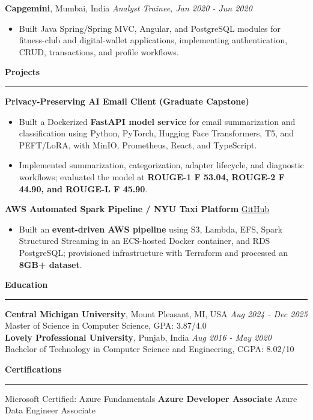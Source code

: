 \documentclass[11pt,letterpaper]{article}
\newcommand{\ressection}[1]{\Needspace{5\baselineskip}\vspace{8pt}\par\textbf{#1}\par\vspace{2pt}\hrule\vspace{5pt}}
\begin{document}
\textbf{Capgemini}, Mumbai, India \hfill \textit{Analyst Trainee, Jan 2020 - Jun 2020}
\begin{itemize}
  \item Built Java Spring/Spring MVC, Angular, and PostgreSQL modules for fitness-club and digital-wallet applications, implementing authentication, CRUD, transactions, and profile workflows.
\end{itemize}

\ressection{Projects}
\textbf{Privacy-Preserving AI Email Client (Graduate Capstone)}
\begin{itemize}
  \item Built a Dockerized \textbf{FastAPI model service} for email summarization and classification using Python, PyTorch, Hugging Face Transformers, T5, and PEFT/LoRA, with MinIO, Prometheus, React, and TypeScript.
  \item Implemented summarization, categorization, adapter lifecycle, and diagnostic workflows; evaluated the model at \textbf{ROUGE-1 F 53.04, ROUGE-2 F 44.90, and ROUGE-L F 45.90}.
\end{itemize}
\vspace{3pt}\par
\textbf{AWS Automated Spark Pipeline / NYU Taxi Platform} \hfill \href{https://github.com/preferablehuman/AWS-automated-spark-pipeline}{GitHub}
\begin{itemize}
  \item Built an \textbf{event-driven AWS pipeline} using S3, Lambda, EFS, Spark Structured Streaming in an ECS-hosted Docker container, and RDS PostgreSQL; provisioned infrastructure with Terraform and processed an \textbf{8GB+ dataset}.
\end{itemize}

\ressection{Education}
\textbf{Central Michigan University}, Mount Pleasant, MI, USA \hfill \textit{Aug 2024 - Dec 2025}\\
Master of Science in Computer Science, GPA: 3.87/4.0\\[3pt]
\textbf{Lovely Professional University}, Punjab, India \hfill \textit{Aug 2016 - May 2020}\\
Bachelor of Technology in Computer Science and Engineering, CGPA: 8.02/10

\ressection{Certifications}
Microsoft Certified: Azure Fundamentals \textbar{} \textbf{Azure Developer Associate} \textbar{} Azure Data Engineer Associate
\end{document}
